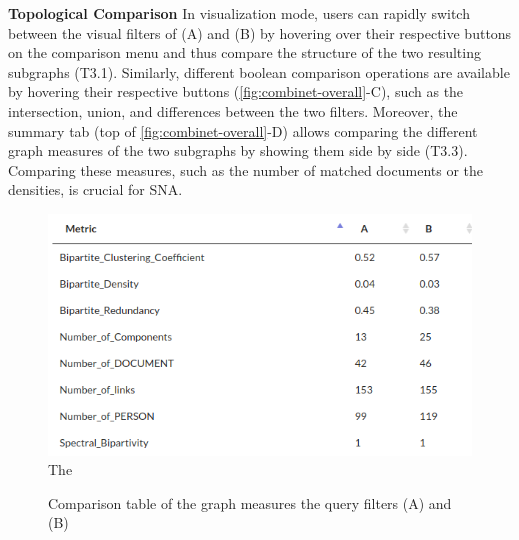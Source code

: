 \noindent\textbf{Topological Comparison}
In visualization mode,
users can rapidly switch between the visual filters of (A) and (B) by hovering over their respective buttons on the comparison menu and thus compare the structure of the two resulting subgraphs (T3.1).
Similarly, different boolean comparison operations are available by hovering their respective buttons (\autoref{fig:combinet-overall}-C), such as the intersection, union, and differences between the two filters. %
Moreover, the summary tab (top of \autoref{fig:combinet-overall}-D) allows comparing the different graph measures of the two subgraphs by showing them side by side (T3.3).
Comparing these measures, such as the number of matched documents or the densities, is crucial for SNA.

\begin{figure}[!ht]
    \centering
    \includegraphics[width=0.8\linewidth]{static/figures/ComBiNet/OriginalPaperFigures/comparisonPlots/graphMeasuresComparison.png}
  The  \caption{Comparison table of the graph measures the query filters (A) and (B)}\label{fig:combinet-comparisonTable}
\end{figure}




